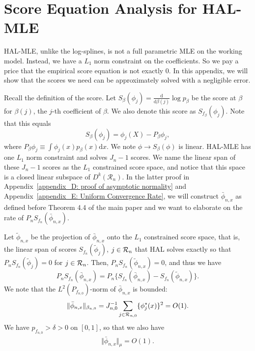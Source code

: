 \section{Score Equation Analysis for HAL-MLE} \label{App C: Score Analysis}
HAL-MLE, unlike the log-splines, is not a full parametric MLE on the working model. Instead, we have a $L_1$ norm constraint on the coefficients. So we pay a price that the  empirical score equation is not exactly 0. In this appendix, we will show that the scores we need can be approximately solved with a negligible error.

Recall the definition of the score. Let $S_{\beta}(\phi_j)=\frac{\mathrm{d}}{\mathrm{d}\beta(j)}\log p_{\beta}$ be the score at $\beta$ for $\beta(j)$, the $j$-th coefficient of $\beta$. We also denote this score as $S_{f_{\beta}}(\phi_j)$.
Note that this equals
\[
S_{\beta}(\phi_j)=\phi_j(X)-P_{\beta}\phi_j, \]
where $P_{\beta}\phi_j\equiv \int \phi_j(x)p_{\beta}(x) \mathrm{d}x$.
We note $\phi\rightarrow S_{\beta}(\phi)$ is linear. HAL-MLE has one $L_1$ norm constraint and solves $J_n - 1$ scores. We name the linear span of these $J_n - 1$ scores as the $L_1$ constrained score space, and notice that this space is a closed linear subspace of $D^k(\mathcal{R}_n)$. In the latter proof in Appendix~\ref{appendix_D: proof of asymptotic normality} and Appendix~\ref{appendix_E: Uniform Convergence Rate}, we will construct $\bar{\phi}_{n,x}$ as defined before Theorem 4.4 of the main paper and we want to elaborate on the rate of $P_n S_{f_n}(\bar{\phi}_{n,x})$.

Let $\tilde{\phi}_{n,x}$ be the projection of $\bar{\phi}_{n,x}$ onto the $L_1$ constrained score space, that is, the linear span of scores $S_{f_n}(\tilde{\phi}_j)$, $j\in {\cal R}_n$ that HAL solves exactly so that $P_n S_{f_n}(\tilde{\phi}_j)=0$ for $j\in {\cal R}_n$. Then, $P_n S_{f_n}(\tilde{\phi}_{n,x})=0$, and thus we have
\[
P_n S_{f_n}(\bar{\phi}_{n,x})=P_n \{S_{f_n}(\bar{\phi}_{n,x})-S_{f_n}(\tilde{\phi}_{n,x})\}.
\]
We note that the $L^2(P_{f_{n,0}})$-norm of $\bar{\phi}_{n,x}$ is bounded:
\begin{align} \label{eq:bar-phi-norm-L2P0}
\Vert \bar{\phi}_{n,x} \Vert_{\beta_{n,0}}=J_{n,0}^{-1}\sum_{j\in {\cal R}_{n,0}}\{\phi_j^*(x)\}^2=O(1).
\end{align}
We have $p_{f_{n,0}}>\delta>0$ on $[0,1]$, so that we also have 
\begin{align} \label{eq:bar-phi-norm-mu-Lebesgue}
\Vert \bar{\phi}_{n,x} \Vert_{\mu}=O(1).
\end{align}

